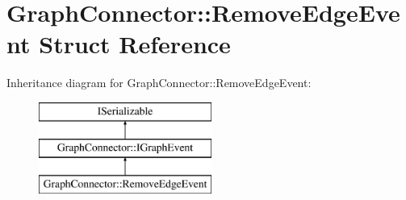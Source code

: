 \hypertarget{struct_graph_connector_1_1_remove_edge_event}{}\section{Graph\+Connector\+:\+:Remove\+Edge\+Event Struct Reference}
\label{struct_graph_connector_1_1_remove_edge_event}
Inheritance diagram for Graph\+Connector\+:\+:Remove\+Edge\+Event\+:\begin{figure}[H]
\begin{center}
\leavevmode
\includegraphics[height=3.000000cm]{struct_graph_connector_1_1_remove_edge_event}
\end{center}
\end{figure}
